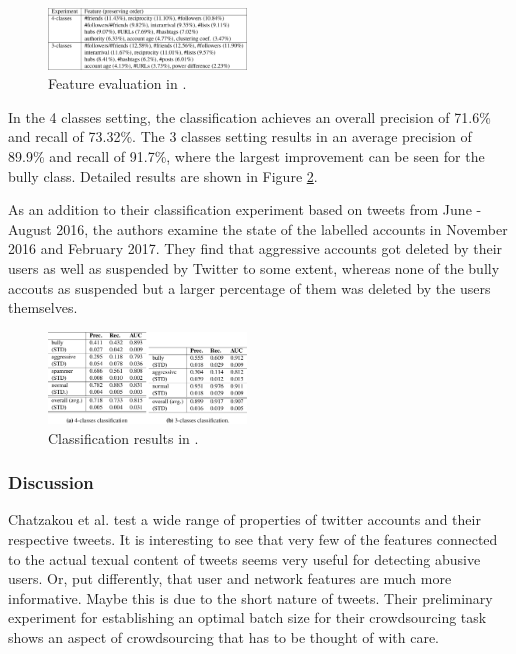\documentclass{proseminar}
\begin{document}
\begin{figure}
\centering
\includegraphics[width=0.47\textwidth]{img/twitter_features}
\caption{Feature evaluation in \cite{Twitter:2017}.}
\label{fig:twitter_features}
\end{figure}

In the 4 classes setting, the classification achieves an overall precision of 71.6\% and recall of 73.32\%. The 3 classes setting results in an average precision of 89.9\% and recall of 91.7\%, where the largest improvement can be seen for the bully class. Detailed results are shown in Figure \ref{fig:twitter_results}.

As an addition to their classification experiment based on tweets from June - August 2016, the authors examine the state of the labelled accounts in November 2016 and February 2017. They find that aggressive accounts got deleted by their users as well as suspended by Twitter to some extent, whereas none of the bully accouts as suspended but a larger percentage of them was deleted by the users themselves.

\begin{figure}
\centering
\includegraphics[width=0.47\textwidth]{img/twitter_results}
\caption{Classification results in \cite{Twitter:2017}.}
\label{fig:twitter_results}
\end{figure}

\subsubsection{Discussion} Chatzakou et al. test a wide range of properties of twitter accounts and their respective tweets. It is interesting to see that very few of the features connected to the actual texual content of tweets seems very useful for detecting abusive users. Or, put differently, that user and network features are much more informative. Maybe this is due to the short nature of tweets. Their preliminary experiment for establishing an optimal batch size for their crowdsourcing task shows an aspect of crowdsourcing that has to be thought of with care.
\end{document}
